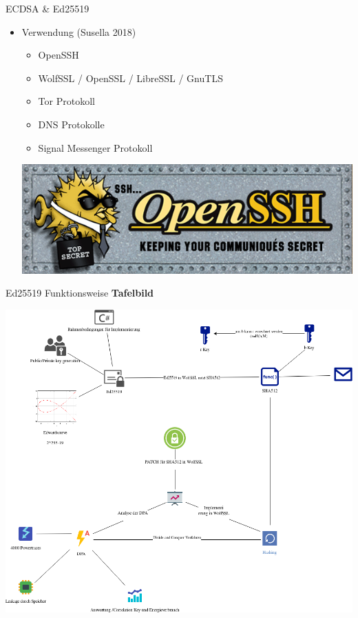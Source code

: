 \documentclass[
  10pt,
  ignorenonframetext,
  aspectratio=169,
]{beamer}
\providecommand{\tightlist}{%
  \setlength{\itemsep}{0pt}\setlength{\parskip}{0pt}}
\begin{document}
\begin{frame}{ECDSA \& Ed25519}
\protect\hypertarget{ecdsa-ed25519-1}{}
\begin{itemize}
\tightlist
\item
  Verwendung (Susella 2018)

  \begin{itemize}
  \tightlist
  \item
    OpenSSH
  \item
    WolfSSL / OpenSSL / LibreSSL / GnuTLS
  \item
    Tor Protokoll
  \item
    DNS Protokolle
  \item
    Signal Messenger Protokoll
  \end{itemize}

  \includegraphics[width=\textwidth,height=0.5\textheight]{Abbildungen/openssh.png}
\end{itemize}
\end{frame}

\begin{frame}{Ed25519 Funktionsweise}
\protect\hypertarget{ed25519-funktionsweise}{}
\textbf{Tafelbild}
\end{frame}

\begin{frame}{}
\protect\hypertarget{section-2}{}
\includegraphics{Abbildungen/ITSEC(1).png}
\end{frame}
\end{document}
